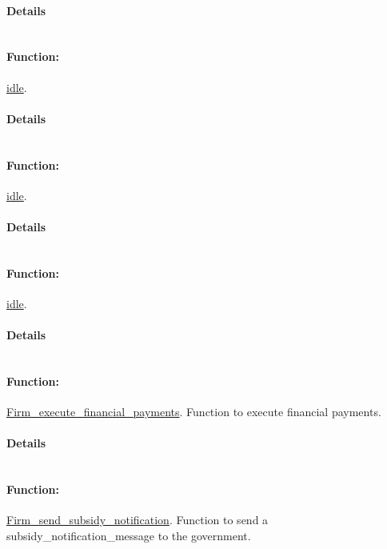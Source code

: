 \documentclass[a4paper,11pt]{article}
\begin{document}
\paragraph{Details}
\begin{verbatim}
\end{verbatim}
\paragraph{Function:}\url{idle}.

\paragraph{Details}
\begin{verbatim}
\end{verbatim}
\paragraph{Function:}\url{idle}.

\paragraph{Details}
\begin{verbatim}
\end{verbatim}
\paragraph{Function:}\url{idle}.

\paragraph{Details}
\begin{verbatim}
\end{verbatim}
\paragraph{Function:}\url{Firm_execute_financial_payments}.
Function to execute financial payments.
\paragraph{Details}
\begin{verbatim}
\end{verbatim}
\paragraph{Function:}\url{Firm_send_subsidy_notification}.
Function to send a subsidy\_notification\_message to the government.
\end{document}
